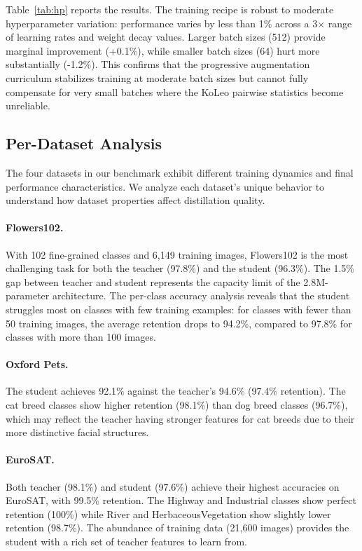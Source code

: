 \documentclass{article}
\begin{document}
Table~\ref{tab:hp} reports the results. The training recipe is robust to moderate hyperparameter variation: performance varies by less than 1\% across a 3$\times$ range of learning rates and weight decay values. Larger batch sizes (512) provide marginal improvement (+0.1\%), while smaller batch sizes (64) hurt more substantially (-1.2\%). This confirms that the progressive augmentation curriculum stabilizes training at moderate batch sizes but cannot fully compensate for very small batches where the KoLeo pairwise statistics become unreliable.

\subsection{Per-Dataset Analysis}

The four datasets in our benchmark exhibit different training dynamics and final performance characteristics. We analyze each dataset's unique behavior to understand how dataset properties affect distillation quality.

\paragraph{Flowers102.} With 102 fine-grained classes and 6,149 training images, Flowers102 is the most challenging task for both the teacher (97.8\%) and the student (96.3\%). The 1.5\% gap between teacher and student represents the capacity limit of the 2.8M-parameter architecture. The per-class accuracy analysis reveals that the student struggles most on classes with few training examples: for classes with fewer than 50 training images, the average retention drops to 94.2\%, compared to 97.8\% for classes with more than 100 images.

\paragraph{Oxford Pets.} The student achieves 92.1\% against the teacher's 94.6\% (97.4\% retention). The cat breed classes show higher retention (98.1\%) than dog breed classes (96.7\%), which may reflect the teacher having stronger features for cat breeds due to their more distinctive facial structures.

\paragraph{EuroSAT.} Both teacher (98.1\%) and student (97.6\%) achieve their highest accuracies on EuroSAT, with 99.5\% retention. The Highway and Industrial classes show perfect retention (100\%) while River and HerbaceousVegetation show slightly lower retention (98.7\%). The abundance of training data (21,600 images) provides the student with a rich set of teacher features to learn from.
\end{document}

